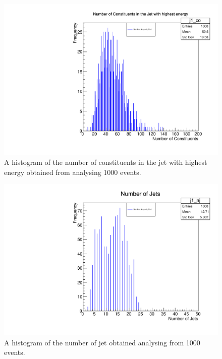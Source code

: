 \begin{figure}[hbtp]
\centering
\includegraphics[scale=.7]{images/myplot3.pdf}
\caption{A histogram of the number of constituents in the jet with highest energy obtained from analysing 1000 events.}
\end{figure}

 
\begin{figure}[hbtp]
\centering
\includegraphics[scale=.7]{images/myplot2.pdf}
\caption{A histogram of the number of jet obtained analysing from 1000 events.}
\end{figure}

%

      